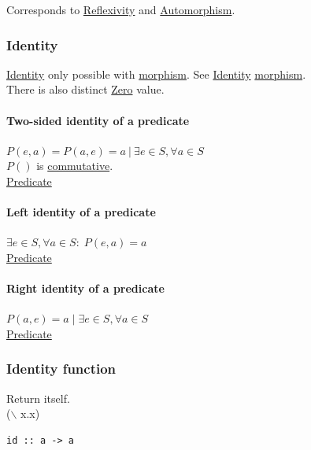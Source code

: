 \documentclass[a4paper,14pt,oneside]{book}
\begin{document}
{Corresponds to \hyperref[orgf2876f0]{Reflexivity} and \hyperref[orgf43d83a]{Automorphism}.\\

\subsubsection{\label{org4f76d7c}Identity}
\label{sec:org9337ed9}
\hyperref[org4f76d7c]{Identity} only possible with \hyperref[orgc09f1a4]{morphism}. See \hyperref[org4f76d7c]{Identity} \hyperref[orgc09f1a4]{morphism}.\\

There is also distinct \hyperref[org9ec9912]{Zero} value.\\

\paragraph{\label{orgf29fded}Two-sided identity of a predicate}
\label{sec:org8d51404}
\(P(e,a)=P(a,e)=a \ | \ \exists e \in S, \forall a \in S\)\\
\(P()\) is \hyperref[orga3bd9ea]{commutative}.\\

\hyperref[orga8f3cfc]{Predicate}\\

\paragraph{\label{org4dd993d}Left identity of a predicate}
\label{sec:org586012c}
\(\exists e \in S, \forall a \in S : \; P(e,a)=a\)\\

\hyperref[orga8f3cfc]{Predicate}\\

\paragraph{\label{org77eb655}Right identity of a predicate}
\label{sec:org7178f0c}
\(P(a,e)=a \; | \; \exists e \in S, \forall a \in S\)\\

\hyperref[orga8f3cfc]{Predicate}\\

\subsubsection{\label{org6a03c9f}Identity function}
\label{sec:org98443e1}
Return itself.\\
($\backslash$ x.x)\\
\begin{verbatim}
id :: a -> a
\end{verbatim}

}
\end{document}

